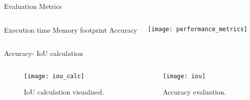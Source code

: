 \begin{frame}[t]{Evaluation Metrics} %
    \begin{columns}[c]
            \newline
            \newline
                Execution time
            \newline
            \newline
                Memory footprint
            \newline
            \newline
                Accuracy
           
        \begin{flushright}
            \texttt{[image: performance\_metrics]}
        \end{flushright} 
    \end{columns}
\end{frame}

\begin{frame}[t]{Accuracy- IoU calculation} 
    \begin{columns}
        \begin{column}{0.5\textwidth}
            \begin{figure}
                \texttt{[image: iou\_calc]}
                \caption{IoU calculation visualized. \cite{ioucalc}}
             \end{figure}
         \end{column}
         \begin{column}{0.5\textwidth}
            \begin{figure}
                \centering
                
               \texttt{[image: iou]}
               \caption{Accuracy evaluation. \cite{IoU}}
            \end{figure}
        \end{column}
        \end{columns}
    
\end{frame}



